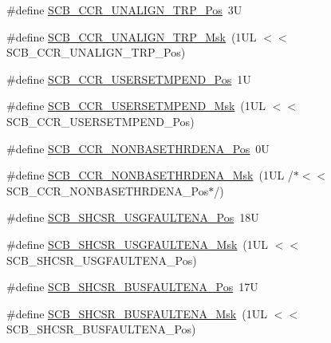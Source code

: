 \begin{DoxyCompactItemize}
\item 
\#define \hyperlink{group___c_m_s_i_s___s_c_b_gac4e4928b864ea10fc24dbbc57d976229}{S\-C\-B\-\_\-\-C\-C\-R\-\_\-\-U\-N\-A\-L\-I\-G\-N\-\_\-\-T\-R\-P\-\_\-\-Pos}~3\-U
\item 
\#define \hyperlink{group___c_m_s_i_s___s_c_b_ga68c96ad594af70c007923979085c99e0}{S\-C\-B\-\_\-\-C\-C\-R\-\_\-\-U\-N\-A\-L\-I\-G\-N\-\_\-\-T\-R\-P\-\_\-\-Msk}~(1\-U\-L $<$$<$ S\-C\-B\-\_\-\-C\-C\-R\-\_\-\-U\-N\-A\-L\-I\-G\-N\-\_\-\-T\-R\-P\-\_\-\-Pos)
\item 
\#define \hyperlink{group___c_m_s_i_s___s_c_b_ga789e41f45f59a8cd455fd59fa7652e5e}{S\-C\-B\-\_\-\-C\-C\-R\-\_\-\-U\-S\-E\-R\-S\-E\-T\-M\-P\-E\-N\-D\-\_\-\-Pos}~1\-U
\item 
\#define \hyperlink{group___c_m_s_i_s___s_c_b_ga4cf59b6343ca962c80e1885710da90aa}{S\-C\-B\-\_\-\-C\-C\-R\-\_\-\-U\-S\-E\-R\-S\-E\-T\-M\-P\-E\-N\-D\-\_\-\-Msk}~(1\-U\-L $<$$<$ S\-C\-B\-\_\-\-C\-C\-R\-\_\-\-U\-S\-E\-R\-S\-E\-T\-M\-P\-E\-N\-D\-\_\-\-Pos)
\item 
\#define \hyperlink{group___c_m_s_i_s___s_c_b_gab4615f7deb07386350365b10240a3c83}{S\-C\-B\-\_\-\-C\-C\-R\-\_\-\-N\-O\-N\-B\-A\-S\-E\-T\-H\-R\-D\-E\-N\-A\-\_\-\-Pos}~0\-U
\item 
\#define \hyperlink{group___c_m_s_i_s___s_c_b_gafe0f6be81b35d72d0736a0a1e3b4fbb3}{S\-C\-B\-\_\-\-C\-C\-R\-\_\-\-N\-O\-N\-B\-A\-S\-E\-T\-H\-R\-D\-E\-N\-A\-\_\-\-Msk}~(1\-U\-L /$\ast$$<$$<$ S\-C\-B\-\_\-\-C\-C\-R\-\_\-\-N\-O\-N\-B\-A\-S\-E\-T\-H\-R\-D\-E\-N\-A\-\_\-\-Pos$\ast$/)
\item 
\#define \hyperlink{group___c_m_s_i_s___s_c_b_gae71949507636fda388ec11d5c2d30b52}{S\-C\-B\-\_\-\-S\-H\-C\-S\-R\-\_\-\-U\-S\-G\-F\-A\-U\-L\-T\-E\-N\-A\-\_\-\-Pos}~18\-U
\item 
\#define \hyperlink{group___c_m_s_i_s___s_c_b_ga056fb6be590857bbc029bed48b21dd79}{S\-C\-B\-\_\-\-S\-H\-C\-S\-R\-\_\-\-U\-S\-G\-F\-A\-U\-L\-T\-E\-N\-A\-\_\-\-Msk}~(1\-U\-L $<$$<$ S\-C\-B\-\_\-\-S\-H\-C\-S\-R\-\_\-\-U\-S\-G\-F\-A\-U\-L\-T\-E\-N\-A\-\_\-\-Pos)
\item 
\#define \hyperlink{group___c_m_s_i_s___s_c_b_ga3d32edbe4a5c0335f808cfc19ec7e844}{S\-C\-B\-\_\-\-S\-H\-C\-S\-R\-\_\-\-B\-U\-S\-F\-A\-U\-L\-T\-E\-N\-A\-\_\-\-Pos}~17\-U
\item 
\#define \hyperlink{group___c_m_s_i_s___s_c_b_ga43e8cbe619c9980e0d1aacc85d9b9e47}{S\-C\-B\-\_\-\-S\-H\-C\-S\-R\-\_\-\-B\-U\-S\-F\-A\-U\-L\-T\-E\-N\-A\-\_\-\-Msk}~(1\-U\-L $<$$<$ S\-C\-B\-\_\-\-S\-H\-C\-S\-R\-\_\-\-B\-U\-S\-F\-A\-U\-L\-T\-E\-N\-A\-\_\-\-Pos)

\end{DoxyCompactItemize}
